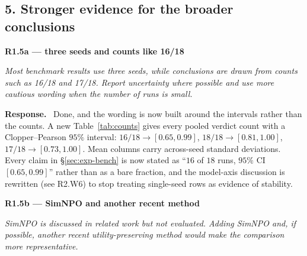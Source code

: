 \documentclass[11pt,a4paper]{article}
\newenvironment{point}[1]{%
  \par\medskip\noindent\textbf{\color{rcol}#1}\par\nopagebreak\smallskip\begingroup
  \color{rcol}\itshape}{\endgroup\par}
\newenvironment{reply}{%
  \par\smallskip\noindent\textbf{\color{acol}Response.}\ \begingroup}{\endgroup\par}
\begin{document}
\subsection*{5. Stronger evidence for the broader conclusions}

\begin{point}{R1.5a --- three seeds and counts like 16/18}
Most benchmark results use three seeds, while conclusions are drawn from counts such as
16/18 and 17/18. Report uncertainty where possible and use more cautious wording when
the number of runs is small.
\end{point}

\begin{reply}
Done, and the wording is now built around the intervals rather than the counts. A new
Table~\ref{tab:counts} gives every pooled verdict count with a Clopper--Pearson $95\%$ interval:
$16/18 \to [0.65, 0.99]$, $18/18 \to [0.81, 1.00]$, $17/18 \to [0.73, 1.00]$. Mean
columns carry across-seed standard deviations. Every claim in \S\ref{sec:exp-bench} is now stated as
``$16$ of $18$ runs, $95\%$ CI $[0.65,0.99]$'' rather than as a bare fraction, and the
model-axis discussion is rewritten (see R2.W6) to stop treating single-seed rows as
evidence of stability.
\end{reply}

\begin{point}{R1.5b --- SimNPO and another recent method}
SimNPO is discussed in related work but not evaluated. Adding SimNPO and, if possible,
another recent utility-preserving method would make the comparison more representative.
\end{point}
\end{document}
